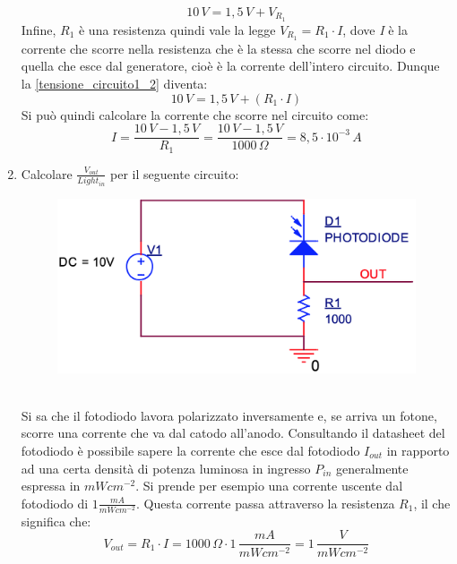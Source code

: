 \documentclass[12pt, a4paper]{report}
\begin{document}
\begin{appendices}
\begin{enumerate}
\begin{equation}
        10\,V = 1,5\,V + V_{R_1}
        \label{tensione_circuito1_2}
    \end{equation}
    Infine, $R_1$ è una resistenza quindi vale la legge $V_{R_1} = R_{1} \cdot I$, dove \textit{I} è la corrente che scorre nella resistenza che è la stessa che scorre nel diodo e quella che esce dal generatore, cioè è la corrente dell'intero circuito. Dunque la \eqref{tensione_circuito1_2} diventa:
    \begin{equation*}
        10\,V = 1,5\,V + (R_1 \cdot I)
    \end{equation*}
    Si può quindi calcolare la corrente che scorre nel circuito come:
    \begin{equation*}
        I = \frac{10\,V - 1,5\,V}{R_1} = \frac{10\,V - 1,5\,V}{1000\,\Omega} = 8,5 \cdot 10^{-3}\,A
    \end{equation*}
    \newpage
    \item Calcolare $\frac{V_{out}}{Light_{in}}$ per il seguente circuito:
    \begin{figure}[ht]
        \centering
        \includegraphics[scale=0.3,angle=0]{diodi_es2.png}
    \end{figure}
    \\Si sa che il fotodiodo lavora polarizzato inversamente e, se arriva un fotone, scorre una corrente che va dal catodo all'anodo. Consultando il datasheet del fotodiodo è possibile sapere la corrente che esce dal fotodiodo $I_{out}$ in rapporto ad una certa densità di potenza luminosa in ingresso $P_{in}$ generalmente espressa in $mWcm^{-2}$. Si prende per esempio una corrente uscente dal fotodiodo di $1 \frac{mA}{mWcm^{-2}}$. Questa corrente passa attraverso la resistenza $R_1$, il che significa che:
    \begin{equation*}
        V_{out} = R_1 \cdot I = 1000\,\Omega \cdot 1\,\frac{mA}{mWcm^{-2}} = 1\,\frac{V}{mWcm^{-2}}
    \end{equation*}

\end{enumerate}
\end{appendices}
\end{document}
